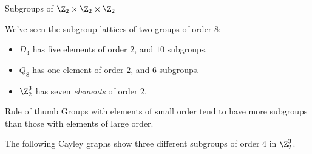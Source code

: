 \documentclass[8pt, handout]{beamer}
\newcommand{\Pause}{\pause}      %
\begin{document}
\begin{frame}{Subgroups of $\Z_2\times\Z_2\times\Z_2$} %
  
  We've seen the subgroup lattices of two groups of order $8$: \Pause
  \begin{itemize}
  \item $D_4$ has five elements of order $2$, and $10$ subgroups. \Pause
  \item $Q_8$ has one element of order $2$, and $6$ subgroups. \Pause
  \item $\Z_2^3$ has seven \emph{elements} of order $2$.
  \end{itemize}  
  
  \smallskip\Pause
  
  \begin{exampleblock}{Rule of thumb}
    Groups with elements of small order tend to have more subgroups
    than those with elements of large order.
  \end{exampleblock}
  
  \medskip\Pause
  
  The following Cayley graphs show three different subgroups of
  order $4$ in $\Z_2^3$.


\end{frame}
\end{document}
